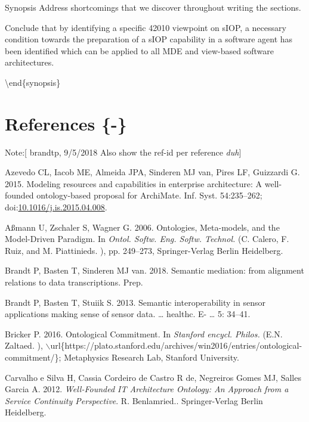 \documentclass[a4paper,11pt,oneside,oldfontcommands]{memoir}
\newcounter{para}
\theoremstyle{definition}
\theoremstyle{break}		%
\numberwithin{equation}{chapter}
\numberwithin{figure}{chapter}
\begin{document}
Synopsis Address shortcomings that we discover throughout writing the
sections.

Conclude that by identifying a specific 42010 viewpoint on sIOP, a
necessary condition towards the preparation of a sIOP capability in a
software agent has been identified which can be applied to all MDE and
view-based software architectures.

\textbackslash{}end\{synopsis\}

\hypertarget{references--}{%
\chapter{References \{-\}}\label{references--}}

\setlength{\parindent}{-0.2in}

\setlength{\leftskip}{0.2in}

\setlength{\parskip}{8pt}

Note:{[} brandtp, 9/5/2018 Also show the ref-id per reference
\emph{duh}{]}

\hypertarget{refs}{}
\leavevmode\hypertarget{ref-Azevedo2015}{}%
Azevedo CL, Iacob ME, Almeida JPA, Sinderen MJ van, Pires LF, Guizzardi
G. 2015. Modeling resources and capabilities in enterprise architecture:
A well-founded ontology-based proposal for ArchiMate. Inf. Syst.
54:235--262;
doi:\href{https://doi.org/10.1016/j.is.2015.04.008}{10.1016/j.is.2015.04.008}.

\leavevmode\hypertarget{ref-Auxdfmann2006}{}%
Aßmann U, Zschaler S, Wagner G. 2006. Ontologies, Meta-models, and the
Model-Driven Paradigm. In \emph{Ontol. Softw. Eng. Softw. Technol.} (C.
Calero, F. Ruiz, and M. Piattinieds. ), pp. 249--273, Springer-Verlag
Berlin Heidelberg.

\leavevmode\hypertarget{ref-Brandt2018b}{}%
Brandt P, Basten T, Sinderen MJ van. 2018. Semantic mediation: from
alignment relations to data transcriptions. Prep.

\leavevmode\hypertarget{ref-Brandt2013}{}%
Brandt P, Basten T, Stuiik S. 2013. Semantic interoperability in sensor
applications making sense of sensor data. \ldots{} healthc. E- \ldots{}
5: 34--41.

\leavevmode\hypertarget{ref-Bricker2016}{}%
Bricker P. 2016. Ontological Commitment. In \emph{Stanford encycl.
Philos.} (E.N. Zaltaed. ),
\(\backslash\)url\{https://plato.stanford.edu/archives/win2016/entries/ontological-commitment/\};
Metaphysics Research Lab, Stanford University.

\leavevmode\hypertarget{ref-CarvalhoeSilva2012}{}%
Carvalho e Silva H, Cassia Cordeiro de Castro R de, Negreiros Gomes MJ,
Salles Garcia A. 2012. \emph{Well-Founded IT Architecture Ontology: An
Approach from a Service Continuity Perspective}. R. Benlamried..
Springer-Verlag Berlin Heidelberg.
\end{document}
